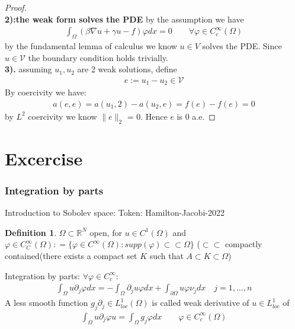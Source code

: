 \documentclass[a4paper,11pt,oneside,fleqn]{book}
\theoremstyle{definition}
\newtheorem{definition}{Definition}[section]
\theoremstyle{remark}
\begin{document}
\begin{proof}
\quad\\
\textbf{2):the weak form solves the PDE}
by the assumption we have
\begin{align*}
	\int_\Omega (\beta \nabla u + \gamma u - f) \varphi dx  = 0 \qquad \forall \varphi \in C_c^\infty(\Omega)
\end{align*}
by the fundamental lemma of calculus we know $u \in V$ solves the PDE. Since $u \in \mathcal{V}$ the boundary condition holds trivially. \\
\textbf{3).}
assuming $u_1, u_2$ are 2 weak solutions, define
\begin{align*}
	e:= u_1 - u_2 \in \mathcal{V}	
\end{align*}
By coercivity we have:
\begin{align*}
	a(e, e) = a(u_1, 2) - a(u_2, e) = f(e) - f(e) = 0
\end{align*}
by $L^2$ coercivity we know $\|e\|_2$ = 0. Hence $e$ is 0 a.e. 
\end{proof}



\section{Excercise}
\subsubsection*{Integration by parts}
Introduction to Sobolev space:
Token: Hamilton-Jacobi-2022
\begin{definition}
	$\Omega \subset \mathbb{R}^N$ open, for $u \in C^1(\Omega)$ and $\varphi \in C_C^\infty(\Omega) : = \{ \varphi \in C^\infty(\Omega): supp(\varphi) \subset\subset \Omega\}$ ($\subset\subset$ compactly contained(there exists a compact set $K$ such that $A \subset K \subset \Omega$)
\end{definition}
Integration by parts: $\forall \varphi \in C_c^\infty$:
\begin{align*}
	\int_{\Omega} u \partial_j \varphi dx = - \int_{\Omega} \partial_j u \varphi dx + \int_{\partial \Omega} u \varphi \nu_j dx \quad j = 1, \dots, n
\end{align*}
A less smooth function $g_j \partial_j \in L_{loc}^1(\Omega)$ is called weak derivative of $u \in L^1_{loc}$ of 
\begin{align*}
	\int_{\Omega} u \partial_j \varphi u = \int_{\Omega} g_j \varphi dx\qquad \varphi \in C_c^\infty(\Omega)
\end{align*}
\end{document}

